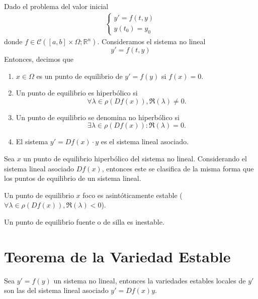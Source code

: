 \begin{defn}
  Dado el problema del valor inicial
  \[ 
    \begin{aligned}
      \begin{cases}
        y' = f(t,y) \\
        y(t_{0}) = y_{0}
      \end{cases}
    \end{aligned} 
  \] 
  donde $f \in \mathcal{C}([ a, b ] \times \Omega ; \mathbb{R}^{n})$. Consideramos el sistema no lineal
  \[ 
    y' = f(t,y) 
  \] 
  Entonces, decimos que
  \begin{enumerate}[label=(\roman*)]
    \item $x \in \Omega$ es un punto de equilibrio de $y' = f(y)$ si $f(x) = 0$.
    \item Un punto de equilibrio es hiperbólico si
      \[ 
        \forall \lambda \in \rho(Df(x)), \Re (\lambda) \neq 0.
      \] 
    \item Un punto de equilibrio se denomina no hiperbólico si
      \[ 
        \exists \lambda \in \rho(Df(x)): \Re (\lambda) = 0.
      \] 
    \item El sistema $y' = Df(x) \cdot y$ es el sistema lineal asociado.
  \end{enumerate}
\end{defn}

\begin{defn}
  Sea $x$ un punto de equilibrio hiperbólico del sistema no lineal. Considerando el sistema lineal asociado $Df(x)$, entonces este se clasifica de la misma forma que los puntos de equilibrio de un sistema lineal.
\end{defn}

\begin{obs}
  Un punto de equilibrio $x$ foco es asintóticamente estable ($\forall \lambda \in \rho(Df(x)), \Re(\lambda) < 0 $).
\end{obs}

\begin{obs}
  Un punto de equilibrio fuente o de silla es inestable.
\end{obs}

\section{Teorema de la Variedad Estable}

\begin{defn}
  Sea $y' = f(y)$ un sistema no lineal, entonces la variedades estables locales de $y'$ son las del sistema lineal asociado $y' = Df(x) y$.
\end{defn}


